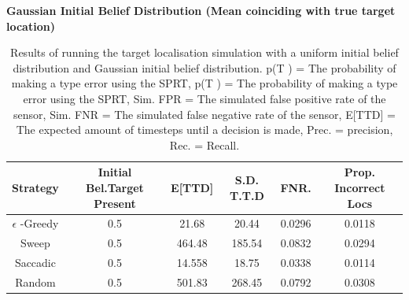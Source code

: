 \textbf{Gaussian Initial Belief Distribution (Mean coinciding with true target location)}
\begin{table}[h!]
    \centering
    \begin{tabular}{|c|c|c|c|c|c|}
    \hline
       Strategy & Initial Bel.Target Present & E[TTD] & S.D. T.T.D & FNR. & Prop. Incorrect Locs \\
        \hline
        $\epsilon$ -Greedy & 0.5 & 21.68 & 20.44 & 0.0296 & 0.0118 \\
        Sweep & 0.5 & 464.48 & 185.54 & 0.0832 & 0.0294 \\
        Saccadic & 0.5 & 14.558 & 18.75 & 0.0338 & 0.0114 \\
        Random & 0.5 & 501.83 & 268.45 & 0.0792 & 0.0308 \\
    \hline
    \end{tabular}

  \caption{Results of running the target localisation simulation with a  uniform initial belief distribution and Gaussian initial belief distribution. p(T ) = The probability of making a type  error using the SPRT, p(T ) = The probability of making a type  error using the SPRT, Sim. FPR = The simulated false positive rate of the sensor, Sim. FNR = The simulated false negative rate of the sensor, E[TTD] = The expected amount of timesteps until a decision is made, Prec. = precision, Rec. = Recall. }\label{table:PriorGaussian}
\end{table}


